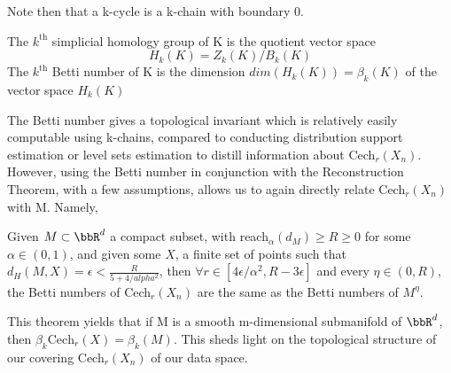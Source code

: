 Note then that a k-cycle is a k-chain with boundary 0.

\begin{definition}
The $k^{\text{th}}$ simplicial homology group of K is the quotient vector space $$H_k(K) = Z_k(K)/B_k(K)$$
The $k^{\text{th}}$ Betti number of K is the dimension $dim(H_k(K)) = \beta_k(K)$ of the vector space $H_k(K)$
\end{definition}

The Betti number gives a topological invariant which is relatively easily computable using k-chains, compared to conducting distribution support estimation or level sets estimation to distill information about Cech$_r(X_n)$. However, using the Betti number in conjunction with the Reconstruction Theorem, with a few assumptions, allows us to again directly relate Cech$_r(X_n)$ with M. Namely, 

\begin{theorem}
Given $M\subset \bbR^d$ a compact subset, with reach$_\alpha(d_M) \geq R \geq 0$ for some $\alpha \in (0,1)$, and given some $X$, a finite set of points such that $d_H(M, X) = \epsilon < \frac{R}{5+4/alpha^2}$, then $\forall r\in [4\epsilon/\alpha^2, R-3\epsilon]$ and every $\eta\in(0, R)$, the Betti numbers of  Cech$_r(X_n)$ are the same as the Betti numbers of $M^\eta$.
\end{theorem}

This theorem yields that if M is a smooth m-dimensional submanifold of $\bbR^d$, then $\beta_k\text{Cech}_r(X) = \beta_k(M)$. This sheds light on the topological structure of our covering Cech$_r(X_n)$ of our data space.